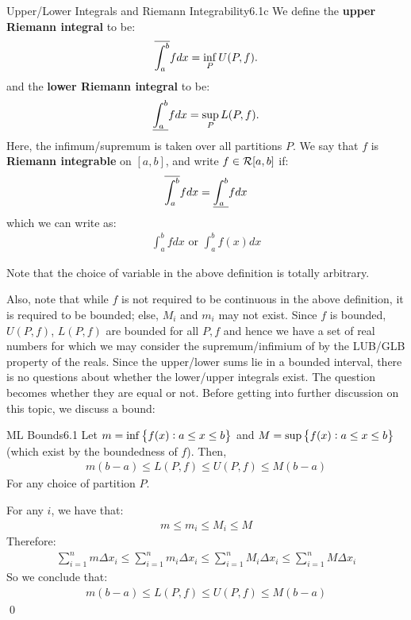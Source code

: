 \setcounter{rudin}{0}
\begin{definition}{Upper/Lower Integrals and Riemann Integrability}{6.1c}
    We define the \textbf{upper Riemann integral} to be:
    \begin{align*}
        \overline{\int_{a}^{b}} f dx = \inf_P U(P, f).
    \end{align*}
    and the \textbf{lower Riemann integral} to be:
    \begin{align*}
        \underline{\int_{a}^{b}} f dx= \sup_P L(P, f).
    \end{align*}
    Here, the infimum/supremum is taken over all partitions $P$. We say that $f$ is \textbf{Riemann integrable} on $[a, b]$, and write $f \in \mathcal{R}[a, b]$ if:
    \begin{align*}
        \overline{\int_{a}^{b}} f dx= \underline{\int_{a}^{b}} f dx
    \end{align*}
    which we can write as:
    \begin{align*}
        \int_{a}^{b} f dx \text{ or } \int_{a}^{b} f(x) dx
    \end{align*}
\end{definition}
\noindent Note that the choice of variable in the above definition is totally arbitrary. 

Also, note that while $f$ is not required to be continuous in the above definition, it is required to be bounded; else, $M_i$ and $m_i$ may not exist. Since $f$ is bounded, $U(P, f)$, $L(P, f)$ are bounded for all $P, f$ and hence we have a set of real numbers for which we may consider the supremum/infimium of by the LUB/GLB property of the reals. Since the upper/lower sums lie in a bounded interval, there is no questions about whether the lower/upper integrals exist. The question becomes whether they are equal or not. Before getting into further discussion on this topic, we discuss a bound:

\setcounter{rudin}{0}
\begin{theorem}{ML Bounds}{6.1}
    Let $m = \inf\set{f(x): a \leq x \leq b}$ and $M = \sup\set{f(x): a \leq x \leq b}$ (which exist by the boundedness of $f$). Then,
    \begin{align*}
        m(b - a) \leq L(P, f) \leq U(P, f) \leq M(b - a)
    \end{align*}
    For any choice of partition $P$.
\end{theorem}
\begin{nproof}
    For any $i$, we have that:
    \begin{align*}
        m \leq m_i \leq M_i \leq M
    \end{align*}
    Therefore:
    \begin{align*}
        \sum_{i=1}^n m \Delta x_i \leq \sum_{i=1}^n m_i \Delta x_i \leq \sum_{i=1}^n M_i \Delta x_i \leq \sum_{i=1}^n M \Delta x_i
    \end{align*}
    So we conclude that:
    \begin{align*}
        m(b - a) \leq L(P, f) \leq U(P, f) \leq M(b - a)
    \end{align*} \qed
\end{nproof}

